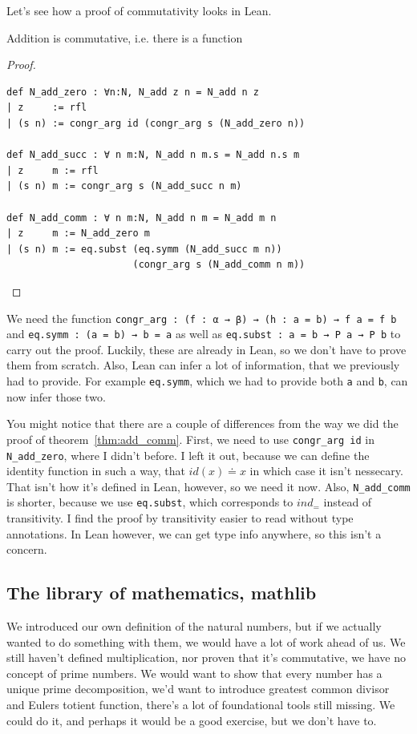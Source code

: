 \documentclass[a4paper, 12pt]{article}
\theoremstyle{changedot}
\theoremstyle{changedotbreak}
\theoremstyle{nonumberplain}
\newtheorem{proof}{Proof}
\begin{document}
Let's see how a proof of commutativity looks in Lean.

\begin{theorem}
  Addition is commutative, i.e. there is a function 
\end{theorem}
\begin{proof}~
  
  \begin{verbatim}
def N_add_zero : ∀n:N, N_add z n = N_add n z
| z     := rfl
| (s n) := congr_arg id (congr_arg s (N_add_zero n))

def N_add_succ : ∀ n m:N, N_add n m.s = N_add n.s m
| z     m := rfl
| (s n) m := congr_arg s (N_add_succ n m)

def N_add_comm : ∀ n m:N, N_add n m = N_add m n
| z     m := N_add_zero m
| (s n) m := eq.subst (eq.symm (N_add_succ m n))
                      (congr_arg s (N_add_comm n m))
\end{verbatim}
\end{proof}

We need the function \texttt{congr_arg : (f : α → β) → (h : a = b) → f a = f b} and \texttt{eq.symm : (a = b) → b = a} as well as \texttt{eq.subst : a = b → P a → P b} to carry out the proof. Luckily, these are already in Lean, so we don't have to prove them from scratch. Also, Lean can infer a lot of information, that we previously had to provide. For example \texttt{eq.symm}, which we had to provide both \texttt{a} and \texttt{b}, can now infer those two.

You might notice that there are a couple of differences from the way we did the proof of theorem~\ref{thm:add_comm}. First, we need to use \texttt{congr_arg id} in \texttt{N_add_zero}, where I didn't before. I left it out, because we can define the identity function in such a way, that $id(x) \doteq x$ in which case it isn't nessecary. That isn't how it's defined in Lean, however, so we need it now. Also, \texttt{N_add_comm} is shorter, because we use \texttt{eq.subst}, which corresponds to $ind_{=}$ instead of transitivity. I find the proof by transitivity easier to read without type annotations. In Lean however, we can get type info anywhere, so this isn't a concern.


\subsection{The library of mathematics, mathlib}
We introduced our own definition of the natural numbers, but if we actually wanted to do something with them, we would have a lot of work ahead of us. We still haven't defined multiplication, nor proven that it's commutative, we have no concept of prime numbers. We would want to show that every number has a unique prime decomposition, we'd want to introduce greatest common divisor and Eulers totient function, there's a lot of foundational tools still missing. We could do it, and perhaps it would be a good exercise, but we don't have to.
\end{document}
